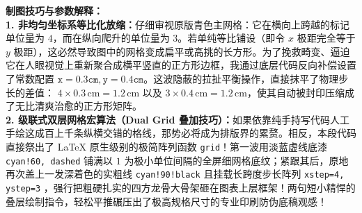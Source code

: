 \documentclass[12pt, a4paper]{ctexrep}
\begin{document}
\vspace{0.6cm}

{\small\color{blue!70!black}
\textbf{制图技巧与参数解释：}\\
\textbf{1. 非均匀坐标系等比化放缩：}仔细审视原版青色主网格：它在横向上跨越的标记单位量为 $4$，而在纵向爬升的单位量为 $3$。若单纯等比铺设（即令 $x$ 极距完全等于 $y$ 极距），这必然导致图中的网格变成扁平或高挑的长方形。为了挽救畸变、逼迫它在人眼视觉上重新聚合成横平竖直的正方形边框，我通过底层代码反向补偿设置了常数配置 $\mathtt{x=0.3cm, y=0.4cm}$。这波隐蔽的拉扯平衡操作，直接抹平了物理步长的差值： $4 \times 0.3\,\text{cm} = 1.2\,\text{cm}$ 以及 $3 \times 0.4\,\text{cm} = 1.2\,\text{cm}$，使其自动被封印压缩成了无比清爽治愈的正方形矩阵。\\
\textbf{2. 级联式双层网格宏算法（Dual Grid 叠加技巧）：}如果依靠纯手持写代码人工手绘这成百上千条纵横交错的格线，那势必将成为排版界的累赘。相反，本段代码直接祭出了 LaTeX 原生级别的极简阵列函数 \texttt{grid}！第一波用淡蓝虚线底漆 \texttt{cyan!60, dashed} 铺满以 $1$ 为极小单位间隔的全屏细网格底纹；紧跟其后，原地再次盖上一发深着色的实粗线 \texttt{cyan!90!black} 且挂载长跨度步长阵列 \texttt{xstep=4, ystep=3} ，强行把粗硬扎实的四方龙骨大骨架砸在图表上层框架！两句短小精悍的叠层绘制指令，轻松平推碾压出了极高规格尺寸的专业印刷防伪底稿观感！
}
\end{document}
